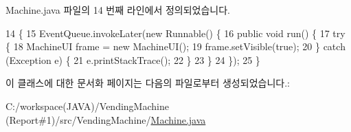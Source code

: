 Machine.\+java 파일의 14 번째 라인에서 정의되었습니다.


\begin{DoxyCode}
14                                            \{
15         EventQueue.invokeLater(\textcolor{keyword}{new} Runnable() \{
16             \textcolor{keyword}{public} \textcolor{keywordtype}{void} run() \{
17                 \textcolor{keywordflow}{try} \{
18                     MachineUI frame = \textcolor{keyword}{new} MachineUI();
19                     frame.setVisible(\textcolor{keyword}{true});
20                 \} \textcolor{keywordflow}{catch} (Exception e) \{
21                     e.printStackTrace();
22                 \}
23             \}
24         \});
25     \}
\end{DoxyCode}


이 클래스에 대한 문서화 페이지는 다음의 파일로부터 생성되었습니다.\+:\begin{DoxyCompactItemize}
\item 
C\+:/workspace(\+J\+A\+V\+A)/\+Vending\+Machine (\+Report\#1)/src/\+Vending\+Machine/\hyperlink{_machine_8java}{Machine.\+java}\end{DoxyCompactItemize}
